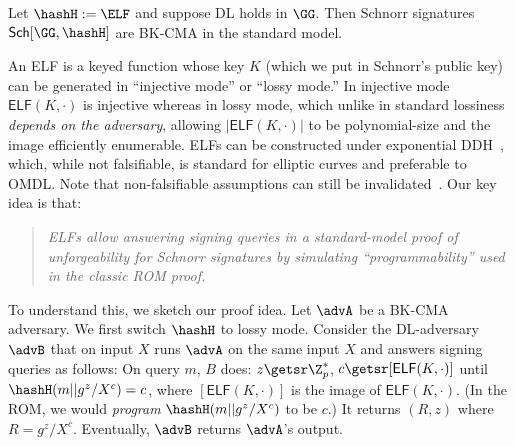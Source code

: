   
  \begin{conj}
      Let $\hashH := \ELF$ and suppose DL holds in $\GG$. Then Schnorr signatures $\mathsf{Sch}[\GG,\hashH]$ are BK-CMA in the standard model.
      \end{conj}
 An ELF is a keyed function whose key $K$ (which we put in Schnorr's public key) can be generated in ``injective mode'' or ``lossy mode.''  In injective mode $\mathsf{ELF}(K,\cdot)$ is injective whereas in lossy mode, which unlike in standard lossiness~\cite{JACM:PeiWat11} \emph{depends on the adversary}, allowing  $|\mathsf{ELF}(K,\cdot)|$  to be polynomial-size  %
 and the  image efficiently enumerable. ELFs can be constructed under  exponential DDH~\cite{C:Zhandry16}, which, while not falsifiable, is standard for elliptic curves and preferable to OMDL. Note that non-falsifiable assumptions can still be  invalidated~\cite{C:BelPal04}. 
Our key idea is that:
\begin{quote}
\emph{ELFs allow answering signing queries in a standard-model proof of unforgeability for Schnorr signatures by simulating ``programmability'' used in the classic ROM proof.} 
\end{quote}
To understand this, we sketch our proof idea. Let  $\advA$ be a BK-CMA adversary. We  first switch $\hashH$ to lossy mode.  Consider the DL-adversary $\advB$ that on input $X$ runs $\advA$ on the same input $X$  and answers signing queries as follows: On query $m$, $B$ does: $z \getsr \Z_p^*$, $c \getsr [\mathsf{ELF}(K,\cdot)]$ until $\hashH(m || g^z/X^c) = c$, where $[\mathsf{ELF}(K,\cdot)]$ is the image of $\mathsf{ELF}(K,\cdot)$. (In the ROM, we would \emph{program} $\hashH(m || g^z/X^c)$ to be $c$.) It returns $(R,z)$ where $R = g^z/X^c$. Eventually, $\advB$ returns $\advA$'s output.  %

